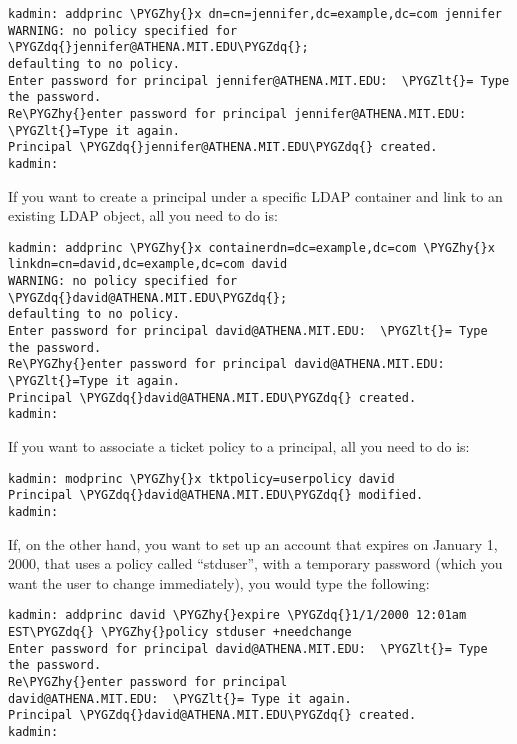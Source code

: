 \documentclass[letterpaper,10pt,english]{sphinxmanual}
\def\PYGZlt{\char`\<}
\def\PYGZhy{\char`\-}
\def\PYGZdq{\char`\"}
\begin{document}
\begin{Verbatim}[commandchars=\\\{\}]
kadmin: addprinc \PYGZhy{}x dn=cn=jennifer,dc=example,dc=com jennifer
WARNING: no policy specified for \PYGZdq{}jennifer@ATHENA.MIT.EDU\PYGZdq{};
defaulting to no policy.
Enter password for principal jennifer@ATHENA.MIT.EDU:  \PYGZlt{}= Type the password.
Re\PYGZhy{}enter password for principal jennifer@ATHENA.MIT.EDU:  \PYGZlt{}=Type it again.
Principal \PYGZdq{}jennifer@ATHENA.MIT.EDU\PYGZdq{} created.
kadmin:
\end{Verbatim}

If you want to create a principal under a specific LDAP container and
link to an existing LDAP object, all you need to do is:

\begin{Verbatim}[commandchars=\\\{\}]
kadmin: addprinc \PYGZhy{}x containerdn=dc=example,dc=com \PYGZhy{}x linkdn=cn=david,dc=example,dc=com david
WARNING: no policy specified for \PYGZdq{}david@ATHENA.MIT.EDU\PYGZdq{};
defaulting to no policy.
Enter password for principal david@ATHENA.MIT.EDU:  \PYGZlt{}= Type the password.
Re\PYGZhy{}enter password for principal david@ATHENA.MIT.EDU:  \PYGZlt{}=Type it again.
Principal \PYGZdq{}david@ATHENA.MIT.EDU\PYGZdq{} created.
kadmin:
\end{Verbatim}

If you want to associate a ticket policy to a principal, all you need
to do is:

\begin{Verbatim}[commandchars=\\\{\}]
kadmin: modprinc \PYGZhy{}x tktpolicy=userpolicy david
Principal \PYGZdq{}david@ATHENA.MIT.EDU\PYGZdq{} modified.
kadmin:
\end{Verbatim}

If, on the other hand, you want to set up an account that expires on
January 1, 2000, that uses a policy called ``stduser'', with a temporary
password (which you want the user to change immediately), you would
type the following:

\begin{Verbatim}[commandchars=\\\{\}]
kadmin: addprinc david \PYGZhy{}expire \PYGZdq{}1/1/2000 12:01am EST\PYGZdq{} \PYGZhy{}policy stduser +needchange
Enter password for principal david@ATHENA.MIT.EDU:  \PYGZlt{}= Type the password.
Re\PYGZhy{}enter password for principal
david@ATHENA.MIT.EDU:  \PYGZlt{}= Type it again.
Principal \PYGZdq{}david@ATHENA.MIT.EDU\PYGZdq{} created.
kadmin:
\end{Verbatim}
\end{document}
